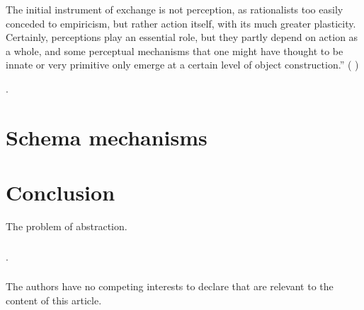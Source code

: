\documentclass[runningheads]{llncs}
\begin{document}
The initial instrument of exchange is not perception, as rationalists too easily conceded to empiricism, but rather action itself, with its much greater plasticity. 
Certainly, perceptions play an essential role, but they partly depend on action as a whole, and some perceptual mechanisms that one might have thought to be innate or very primitive only emerge at a certain level of object construction.'' (\cite{piaget_principles_1997}
)


\cite{ziemke_construction_2001}.

\section{Schema mechanisms}

 
\cite{drescher_made-up_1991}
\cite{chaput_constructivist_2004}
\cite{georgeon_intrinsically-motivated_2012} 
\cite{perotto_computational_nodate} 
\cite{guerin_piagetian_2008}
\cite{wang_new_2012}
\section{Conclusion}

The problem of abstraction. 


\begin{credits}
\subsubsection{\ackname} .

\subsubsection{\discintname}
The authors have no competing interests to declare that are
relevant to the content of this article.
\end{credits}
%
%
%


%
\end{document}
